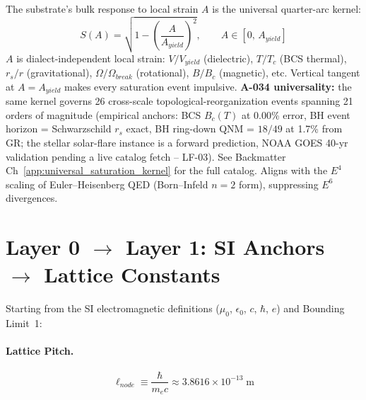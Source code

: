 \begin{axiom}
The substrate's bulk response to local strain $A$ is the universal quarter-arc
kernel:
\begin{equation}
    S(A) = \sqrt{1 - \left(\dfrac{A}{A_{yield}}\right)^{\!2}},\qquad
    A \in [0,\, A_{yield}]
    \label{eq:dielectric_saturation}
\end{equation}
$A$ is dialect-independent local strain: $V/V_{yield}$ (dielectric), $T/T_c$
(BCS thermal), $r_s/r$ (gravitational), $\Omega/\Omega_{break}$ (rotational),
$B/B_c$ (magnetic), etc. Vertical tangent at $A = A_{yield}$ makes every
saturation event impulsive. \textbf{A-034 universality:} the same kernel governs
26 cross-scale topological-reorganization events spanning 21 orders of magnitude
(empirical anchors: BCS $B_c(T)$ at 0.00\% error, BH event horizon =
Schwarzschild $r_s$ exact, BH ring-down QNM = $18/49$ at 1.7\% from GR;
the stellar solar-flare instance is a forward prediction, NOAA GOES 40-yr
validation pending a live catalog fetch -- LF-03). See Backmatter
Ch~\ref{app:universal_saturation_kernel} for the full catalog. Aligns with the
$E^4$ scaling of Euler--Heisenberg QED (Born--Infeld $n=2$ form),
suppressing $E^6$ divergences.
\end{axiom}

\section{Layer 0 $\to$ Layer 1: SI Anchors $\to$ Lattice Constants}
\label{sec:layer01}

Starting from the SI electromagnetic definitions ($\mu_0$, $\epsilon_0$, $c$,
$\hbar$, $e$) and Bounding Limit~1:

\paragraph{Lattice Pitch.}
\begin{equation}
    \ell_{node} \equiv \frac{\hbar}{m_e c}
    \approx 3.8616 \times 10^{-13}\;\text{m}
    \label{eq:lnode}
\end{equation}

